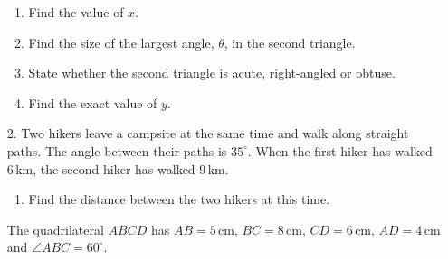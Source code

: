 \documentclass[12pt, twoside]{article}
\begin{document}
\begin{enumerate}[itemsep=0.15cm]
\begin{enumerate}[itemsep=0.1cm]
  \item Find the value of $x$.
  \item Find the size of the largest angle, $\theta$, in the second triangle.
  \item State whether the second triangle is acute, right-angled or obtuse.
  \item Find the exact value of $y$.
\end{enumerate}


\newpage

\item[2.]
Two hikers leave a campsite at the same time and walk along straight paths.
The angle between their paths is $35^\circ$. When the first hiker has walked
$6\,\text{km}$, the second hiker has walked $9\,\text{km}$.

\begin{enumerate}[itemsep=0.1cm]
  \item Find the distance between the two hikers at this time.
\end{enumerate}

The quadrilateral $ABCD$ has $AB = 5\,\text{cm}$, $BC = 8\,\text{cm}$,
$CD = 6\,\text{cm}$, $AD = 4\,\text{cm}$ and $\angle ABC = 60^\circ$.

\begin{center}
\end{center}


\end{enumerate}
\end{document}
